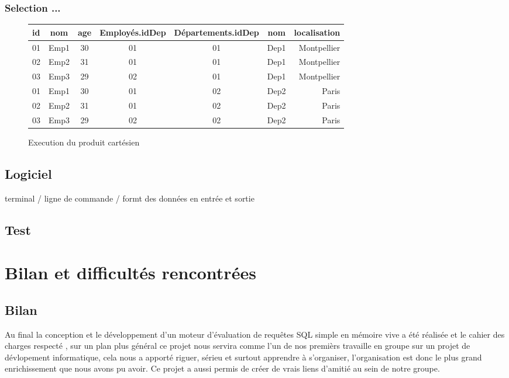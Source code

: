 \documentclass[oneside,13pt,a4paper]{report}
\begin{document}
\subsection{Selection ...}
	\begin{figure}[h!]
		\centering
		\caption{Execution du produit cartésien}
		\begin{tabular}{|l|c|c|c|c|c|r|}
			\hline
			id   & nom  & age & Employés.idDep & Départements.idDep & nom   & localisation
			\\
			\hline
			01 & Emp1 &  30 & 01 & 01 & Dep1 &  Montpellier \\
			02 & Emp2 &  31 & 01 & 01 & Dep1 &  Montpellier \\
			03 & Emp3 &  29 & 02 & 01 & Dep1 &  Montpellier \\
			01 & Emp1 &  30 & 01 & 02 & Dep2 &  Paris \\
			02 & Emp2 &  31 & 01 & 02 & Dep2 &  Paris \\
			03 & Emp3 &  29 & 02 & 02 & Dep2 &  Paris \\
			\hline
		\end{tabular}
	\end{figure}


\section{Logiciel}

terminal / ligne de commande / formt des données en entrée et sortie

\section{Test}



\chapter{Bilan et difficultés rencontrées}
\section{Bilan}

Au final la conception et le développement d'un moteur d'évaluation de requêtes SQL simple en mémoire vive a été réalisée et le cahier des charges respecté , sur un plan plus général ce projet nous servira comme l'un de nos premièrs travaille en groupe sur un projet de dévlopement informatique, cela nous a apporté riguer, sérieu et surtout apprendre à s'organiser, l'organisation est donc le plus grand enrichissement que nous avons pu avoir.
 \newline Ce projet a aussi permis de créer de vrais liens d'amitié au sein de notre groupe.
\end{document}
